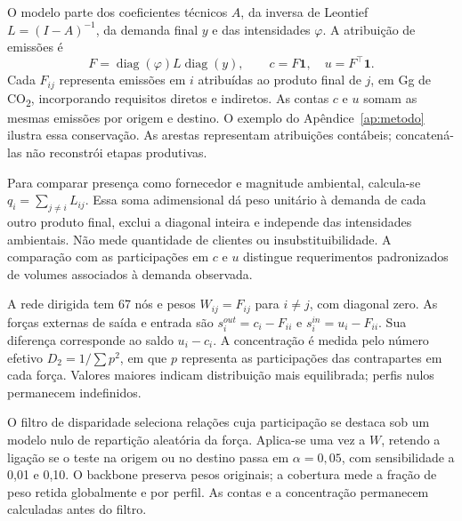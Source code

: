O modelo parte dos coeficientes técnicos $A$, da inversa de Leontief $L=(I-A)^{-1}$, da demanda final $y$ e das intensidades $\varphi$. A atribuição de emissões é
\begin{equation}
F=\operatorname{diag}(\varphi)L\operatorname{diag}(y),\qquad c=F\mathbf1,\quad u=F^\top\mathbf1.
\label{eq:artigo-F}
\end{equation}
Cada $F_{ij}$ representa emissões em $i$ atribuídas ao produto final de $j$, em Gg de CO\textsubscript{2}, incorporando requisitos diretos e indiretos. As contas $c$ e $u$ somam as mesmas emissões por origem e destino. O exemplo do Apêndice~\ref{ap:metodo} ilustra essa conservação. As arestas representam atribuições contábeis; concatená-las não reconstrói etapas produtivas.

Para comparar presença como fornecedor e magnitude ambiental, calcula-se $q_i=\sum_{j\ne i}L_{ij}$. Essa soma adimensional dá peso unitário à demanda de cada outro produto final, exclui a diagonal inteira e independe das intensidades ambientais. Não mede quantidade de clientes ou insubstituibilidade. A comparação com as participações em $c$ e $u$ distingue requerimentos padronizados de volumes associados à demanda observada.

A rede dirigida tem 67 nós e pesos $W_{ij}=F_{ij}$ para $i\ne j$, com diagonal zero. As forças externas de saída e entrada são $s_i^{out}=c_i-F_{ii}$ e $s_i^{in}=u_i-F_{ii}$. Sua diferença corresponde ao saldo $u_i-c_i$. A concentração é medida pelo número efetivo $D_2=1/\sum p^2$, em que $p$ representa as participações das contrapartes em cada força. Valores maiores indicam distribuição mais equilibrada; perfis nulos permanecem indefinidos.

O filtro de disparidade \parencite{serrano2009} seleciona relações cuja participação se destaca sob um modelo nulo de repartição aleatória da força. Aplica-se uma vez a $W$, retendo a ligação se o teste na origem ou no destino passa em $\alpha=0{,}05$, com sensibilidade a 0,01 e 0,10. O backbone preserva pesos originais; a cobertura mede a fração de peso retida globalmente e por perfil. As contas e a concentração permanecem calculadas antes do filtro.

